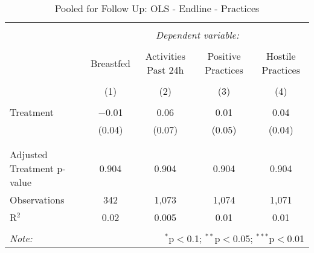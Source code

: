 
\begin{table}[!htbp] \centering 
  \caption{Pooled for Follow Up: OLS - Endline - Practices} 
  \label{tbl:Pooled for Follow Up: OLS - Endline - Practices} 
\begin{tabular}{@{\extracolsep{5pt}}lcccc} 
\\[-1.8ex]\hline 
\hline \\[-1.8ex] 
 & \multicolumn{4}{c}{\textit{Dependent variable:}} \\ 
\cline{2-5} 
\\[-1.8ex] & Breastfed & Activities Past 24h & Positive Practices & Hostile Practices \\ 
\\[-1.8ex] & (1) & (2) & (3) & (4)\\ 
\hline \\[-1.8ex] 
 Treatment & $-$0.01 & 0.06 & 0.01 & 0.04 \\ 
  & (0.04) & (0.07) & (0.05) & (0.04) \\ 
  & & & & \\ 
\hline \\[-1.8ex] 
Adjusted Treatment p-value & 0.904 & 0.904 & 0.904 & 0.904 \\ 
Observations & 342 & 1,073 & 1,074 & 1,071 \\ 
R$^{2}$ & 0.02 & 0.005 & 0.01 & 0.01 \\ 
\hline 
\hline \\[-1.8ex] 
\textit{Note:}  & \multicolumn{4}{r}{$^{*}$p$<$0.1; $^{**}$p$<$0.05; $^{***}$p$<$0.01} \\ 
\end{tabular} 
\end{table} 
